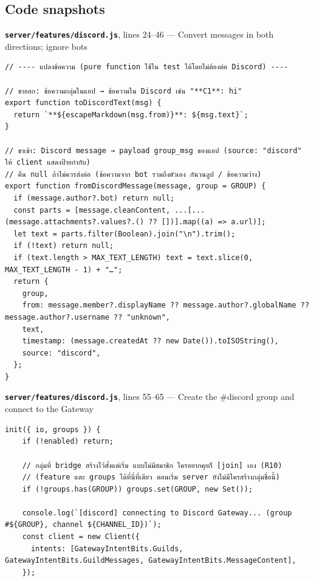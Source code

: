 \documentclass[11pt,a4paper]{article}
\newcommand{\code}[1]{\texttt{#1}}
\newcommand{\snap}[3]{\par\medskip\textbf{\code{#1}}, lines #2 --- #3}
\begin{document}
\subsection*{Code snapshots}
\snap{server/features/discord.js}{24--46}{Convert messages in both directions; ignore bots}
\begin{Verbatim}[firstnumber=24]
// ---- แปลงข้อความ (pure function ใช้ใน test ได้โดยไม่ต้องต่อ Discord) ----

// ขาออก: ข้อความกลุ่มในแอป → ข้อความใน Discord เช่น "**C1**: hi"
export function toDiscordText(msg) {
  return `**${escapeMarkdown(msg.from)}**: ${msg.text}`;
}

// ขาเข้า: Discord message → payload group_msg ของแอป (source: "discord" ให้ client แสดงป้ายกำกับ)
// คืน null ถ้าไม่ควรส่งต่อ (ข้อความจาก bot รวมถึงตัวเอง กันวนลูป / ข้อความว่าง)
export function fromDiscordMessage(message, group = GROUP) {
  if (message.author?.bot) return null;
  const parts = [message.cleanContent, ...[...(message.attachments?.values?.() ?? [])].map((a) => a.url)];
  let text = parts.filter(Boolean).join("\n").trim();
  if (!text) return null;
  if (text.length > MAX_TEXT_LENGTH) text = text.slice(0, MAX_TEXT_LENGTH - 1) + "…";
  return {
    group,
    from: message.member?.displayName ?? message.author?.globalName ?? message.author?.username ?? "unknown",
    text,
    timestamp: (message.createdAt ?? new Date()).toISOString(),
    source: "discord",
  };
}
\end{Verbatim}

\snap{server/features/discord.js}{55--65}{Create the \#discord group and connect to the Gateway}
\begin{Verbatim}[firstnumber=55]
  init({ io, groups }) {
    if (!enabled) return;

    // กลุ่มที่ bridge สร้างไว้ตั้งแต่เริ่ม แบบไม่มีสมาชิก ใครอยากคุยก็ [join] เอง (R10)
    // (feature แตะ groups ได้ที่นี่ที่เดียว ตอนเริ่ม server ยังไม่มีใครสร้างกลุ่มชื่อนี้)
    if (!groups.has(GROUP)) groups.set(GROUP, new Set());

    console.log(`[discord] connecting to Discord Gateway... (group #${GROUP}, channel ${CHANNEL_ID})`);
    const client = new Client({
      intents: [GatewayIntentBits.Guilds, GatewayIntentBits.GuildMessages, GatewayIntentBits.MessageContent],
    });
\end{Verbatim}
\end{document}
